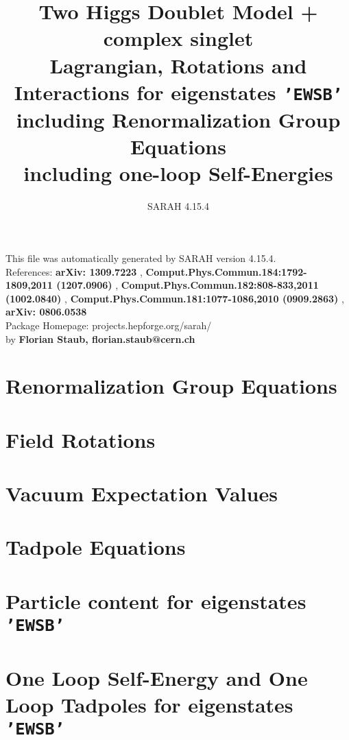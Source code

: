 \documentclass[A4]{article}
\begin{document}
\title{Two Higgs Doublet Model + complex singlet\\ Lagrangian, Rotations and Interactions for eigenstates {\tt'EWSB'} \\ including Renormalization Group Equations \\ 
including one-loop Self-Energies \\ 
} 
\author{SARAH 4.15.4} 
 \maketitle 
 \vspace{10cm} 
This file was automatically generated by SARAH version 4.15.4.  \\ 
References: {\bf arXiv: 1309.7223 }, {\bf Comput.Phys.Commun.184:1792-1809,2011 (1207.0906) }, {\bf Comput.Phys.Commun.182:808-833,2011 (1002.0840) }, {\bf Comput.Phys.Commun.181:1077-1086,2010 (0909.2863) }, {\bf arXiv: 0806.0538 } \\ 
Package Homepage: projects.hepforge.org/sarah/ \\ 
by {\bf Florian Staub, florian.staub@cern.ch} 
 \pagebreak 
 \tableofcontents 
 \pagebreak 
 \allowdisplaybreaks 

\section{Renormalization Group Equations}
 
\section{Field Rotations}
 
 
 
\section{Vacuum Expectation Values}
 
\section{Tadpole Equations}
 
\section{Particle content for eigenstates {\tt 'EWSB'}}
 
\section{One Loop Self-Energy and One Loop Tadpoles for eigenstates {\tt 'EWSB'}}
\end{document}

